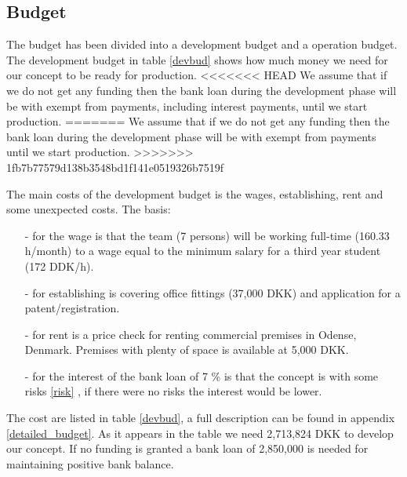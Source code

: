 \subsection{Budget}
\label{budget_label}
The budget has been divided into a development budget and a operation budget. 
The development budget in table \ref{devbud} shows how much money we need for our concept to be ready for production. 
<<<<<<< HEAD
We assume that if we do not get any funding then the bank loan during the development phase will be with exempt from payments, including interest payments, until we start production. 
=======
We assume that if we do not get any funding then the bank loan during the development phase will be with exempt from payments until we start production. 
>>>>>>> 1fb7b77579d138b3548bd1f141e0519326b7519f

The main costs of the development budget is the wages, establishing, rent and some unexpected costs. 
The basis: \begin{itemize}
\item[-] for the wage is that the team (7 persons) will be working full-time (160.33 h/month) to a wage equal to the minimum salary for a third year student (172 DDK/h\cite{ida-salary}).
\item[-] for establishing is covering office fittings (37,000 DKK) and application for a patent/registration.
\item[-] for rent is a price check for renting commercial premises in Odense, Denmark. Premises with plenty of space is available at 5,000 DKK.\cite{rent_prices}
\item[-] for the interest of the bank loan of 7 \% is that the concept is with some risks \ref{risk} , if there were no risks the interest would be lower. 
\end{itemize} 
The cost are listed in table \ref{devbud}, a full description can be found in appendix \ref{detailed_budget}. 
As it appears in the table we need 2,713,824 DKK to develop our concept. 
If no funding is granted a bank loan of 2,850,000 is needed for maintaining positive bank balance.

